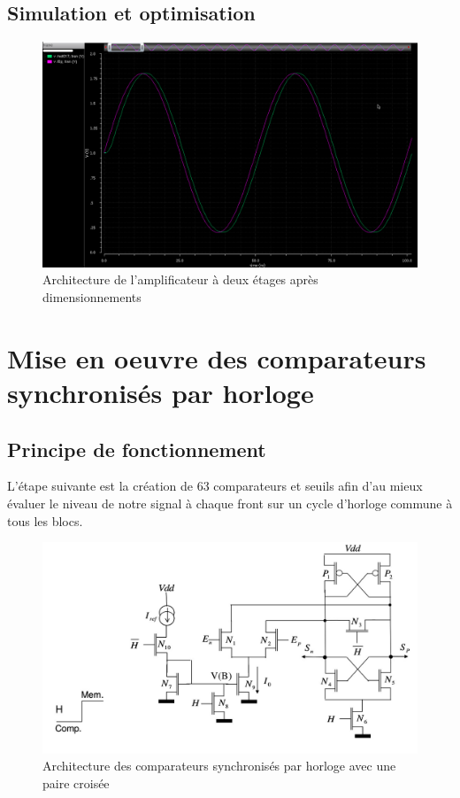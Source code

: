 \documentclass[11pt]{article}
\begin{document}
\clearpage

\subsection{Simulation et optimisation}

\begin{figure}[!htb]
\begin{center}
  \includegraphics[width=\linewidth]{reponse_ampli.png}
  \caption{Architecture de l'amplificateur \`a deux \'etages apr\`es dimensionnements}
\end{center}
\end{figure}


\clearpage

\section{Mise en oeuvre des comparateurs synchronis\'es par horloge}
\subsection{Principe de fonctionnement}
L'\'etape suivante est la cr\'eation de 63 comparateurs et seuils afin d'au mieux \'evaluer le niveau de
notre signal \`a chaque front sur un cycle d'horloge commune \`a tous les blocs.

\begin{figure}[!htb]
\begin{center}
  \includegraphics[scale=0.38]{comparateur_schema.jpg}
  \caption{Architecture des comparateurs synchronis\'es par horloge avec une paire crois\'ee}
\end{center}
\end{figure}
\end{document}
